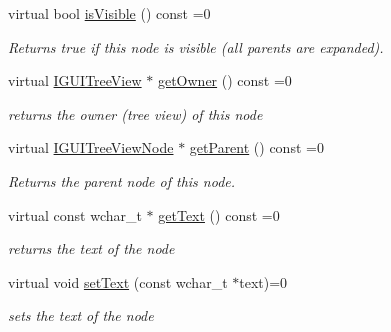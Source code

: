 \begin{DoxyCompactItemize}
\mbox{\label{classirr_1_1gui_1_1IGUITreeViewNode_a8b292990c1a9c7d368d870c82d610c31}} 
virtual bool \hyperlink{classirr_1_1gui_1_1IGUITreeViewNode_a8b292990c1a9c7d368d870c82d610c31}{is\+Visible} () const =0
\begin{DoxyCompactList}\small\item\em Returns true if this node is visible (all parents are expanded). \end{DoxyCompactList}\item 
\mbox{\label{classirr_1_1gui_1_1IGUITreeViewNode_abbd99821712d9e32f222460dcad0858a}} 
virtual \hyperlink{classirr_1_1gui_1_1IGUITreeView}{I\+G\+U\+I\+Tree\+View} $\ast$ \hyperlink{classirr_1_1gui_1_1IGUITreeViewNode_abbd99821712d9e32f222460dcad0858a}{get\+Owner} () const =0
\begin{DoxyCompactList}\small\item\em returns the owner (tree view) of this node \end{DoxyCompactList}\item 
virtual \hyperlink{classirr_1_1gui_1_1IGUITreeViewNode}{I\+G\+U\+I\+Tree\+View\+Node} $\ast$ \hyperlink{classirr_1_1gui_1_1IGUITreeViewNode_a37d30138ae01528cb1213324c511d079}{get\+Parent} () const =0
\begin{DoxyCompactList}\small\item\em Returns the parent node of this node. \end{DoxyCompactList}\item 
\mbox{\label{classirr_1_1gui_1_1IGUITreeViewNode_a2d0d53b4dbada5aa332ba1756722bb1c}} 
virtual const wchar\+\_\+t $\ast$ \hyperlink{classirr_1_1gui_1_1IGUITreeViewNode_a2d0d53b4dbada5aa332ba1756722bb1c}{get\+Text} () const =0
\begin{DoxyCompactList}\small\item\em returns the text of the node \end{DoxyCompactList}\item 
\mbox{\label{classirr_1_1gui_1_1IGUITreeViewNode_a572a16938c907034e1e7b33b2851ad52}} 
virtual void \hyperlink{classirr_1_1gui_1_1IGUITreeViewNode_a572a16938c907034e1e7b33b2851ad52}{set\+Text} (const wchar\+\_\+t $\ast$text)=0
\begin{DoxyCompactList}\small\item\em sets the text of the node \end{DoxyCompactList}\item 

\end{DoxyCompactItemize}
